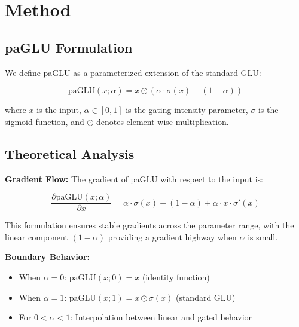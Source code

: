 \documentclass[11pt]{article}
\begin{document}
\section{Method}
\label{sec:method}

\subsection{paGLU Formulation}

We define paGLU as a parameterized extension of the standard GLU:

\begin{equation}
\text{paGLU}(x; \alpha) = x \odot (\alpha \cdot \sigma(x) + (1-\alpha))
\label{eq:paglu}
\end{equation}

where $x$ is the input, $\alpha \in [0,1]$ is the gating intensity parameter, $\sigma$ is the sigmoid function, and $\odot$ denotes element-wise multiplication.

\subsection{Theoretical Analysis}

\textbf{Gradient Flow:} The gradient of paGLU with respect to the input is:

\begin{equation}
\frac{\partial \text{paGLU}(x; \alpha)}{\partial x} = \alpha \cdot \sigma(x) + (1-\alpha) + \alpha \cdot x \cdot \sigma'(x)
\label{eq:gradient}
\end{equation}

This formulation ensures stable gradients across the parameter range, with the linear component $(1-\alpha)$ providing a gradient highway when $\alpha$ is small.

\textbf{Boundary Behavior:} 
\begin{itemize}
    \item When $\alpha = 0$: $\text{paGLU}(x; 0) = x$ (identity function)
    \item When $\alpha = 1$: $\text{paGLU}(x; 1) = x \odot \sigma(x)$ (standard GLU)
    \item For $0 < \alpha < 1$: Interpolation between linear and gated behavior
\end{itemize}
\end{document}
